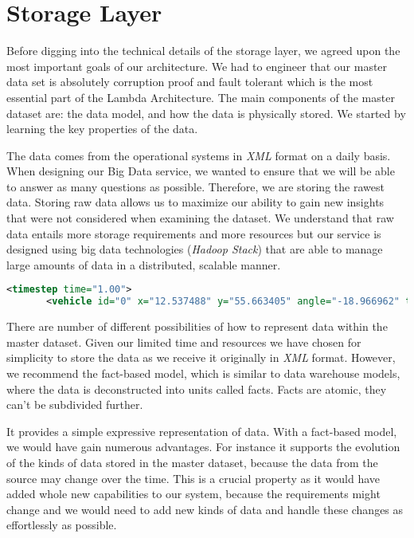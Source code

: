 \documentclass[format=acmsmall, review=false, screen=true]{acmart}
\begin{document}
\section{Storage Layer}

Before digging into the technical details of the storage layer, we agreed upon the most important goals of our architecture. We had to engineer that our master data set is absolutely corruption proof and fault tolerant which is the most essential part of the Lambda Architecture. The main components of the master dataset are: the data model, and how the data is physically stored. We started by learning the key properties of the data.

The data comes from the operational systems in \textit{XML} format on a daily basis. When designing our Big Data service, we wanted to ensure that we will be able to answer as many questions as possible. Therefore, we are storing the rawest data. Storing raw data allows us to maximize our ability to gain new insights that were not considered when examining the dataset. We understand that raw data entails more storage requirements and more resources but our service is designed using big data technologies (\textit{Hadoop Stack}) that are able to manage large amounts of data in a distributed, scalable manner.

\begin{lstlisting}[language=xml]
<timestep time="1.00">
       <vehicle id="0" x="12.537488" y="55.663405" angle="-18.966962" type="DEFAULT_VEHTYPE" speed="1.673759" pos="6.773759" lane="27409327_0" slope="0.000000"/>
\end{lstlisting}

There are number of different possibilities of how to represent data within the master dataset. Given our limited time and resources we have chosen for simplicity to store the data as we receive it originally in \textit{XML} format. However, we recommend the fact-based model, which is similar to data warehouse models, where the data is deconstructed into units called facts. Facts are atomic, they can’t be subdivided further.

It provides a simple expressive representation of data. With a fact-based model, we would have gain numerous advantages. For instance it supports the evolution of the kinds of data stored in the master dataset, because the data from the source may change over the time. This is a crucial property as it would have added whole new capabilities to our system, because the  requirements might change and we would need to add new kinds of data and handle these changes as effortlessly as possible.
\end{document}
